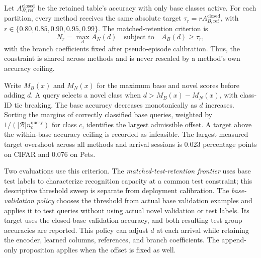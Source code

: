 \documentclass[research]{fcs}
\begin{document}
Let $A_{B,\mathrm{ref}}^{\mathrm{closed}}$ be the retained table's accuracy with only base classes active. For each partition, every method receives the same absolute target $\tau_r=rA_{B,\mathrm{ref}}^{\mathrm{closed}}$, with $r\in\{0.80,0.85,0.90,0.95,0.99\}$. The matched-retention criterion is
\begin{equation}
 N_r=\max_d A_N(d)\quad\text{subject to}\quad A_B(d)\geq\tau_r,
 \label{eq:retentioncriterion}
\end{equation}
with the branch coefficients fixed after pseudo-episode calibration. Thus, the constraint is shared across methods and is never rescaled by a method's own accuracy ceiling.

Write $M_B(x)$ and $M_N(x)$ for the maximum base and novel scores before adding $d$. A query selects a novel class when $d>M_B(x)-M_N(x)$, with class-ID tie breaking. The base accuracy decreases monotonically as $d$ increases. Sorting the margins of correctly classified base queries, weighted by $1/(|\mathcal B|n_c^{\mathrm{query}})$ for class $c$, identifies the largest admissible offset. A target above the within-base accuracy ceiling is recorded as infeasible. The largest measured target overshoot across all methods and arrival sessions is 0.023 percentage points on CIFAR and 0.076 on Pets.

Two evaluations use this criterion. The \emph{matched-test-retention frontier} uses base test labels to characterize recognition capacity at a common test constraint; this descriptive threshold sweep is separate from deployment calibration. The \emph{base-validation policy} chooses the threshold from actual base validation examples and applies it to test queries without using actual novel validation or test labels. Its target uses the closed-base validation accuracy, and both resulting test group accuracies are reported. This policy can adjust $d$ at each arrival while retaining the encoder, learned columns, references, and branch coefficients. The append-only proposition applies when the offset is fixed as well.
\end{document}
